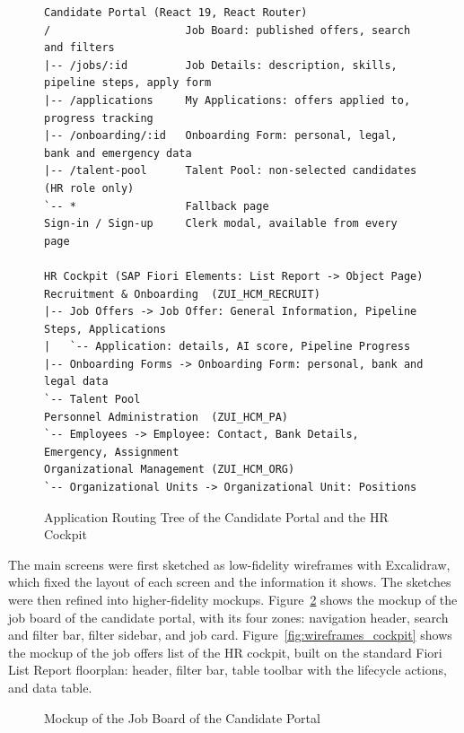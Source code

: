 \begin{figure}[H]
\centering
\begin{minipage}{0.97\textwidth}
\linespread{1}\selectfont\footnotesize
\begin{verbatim}
Candidate Portal (React 19, React Router)
/                     Job Board: published offers, search and filters
|-- /jobs/:id         Job Details: description, skills, pipeline steps, apply form
|-- /applications     My Applications: offers applied to, progress tracking
|-- /onboarding/:id   Onboarding Form: personal, legal, bank and emergency data
|-- /talent-pool      Talent Pool: non-selected candidates (HR role only)
`-- *                 Fallback page
Sign-in / Sign-up     Clerk modal, available from every page

HR Cockpit (SAP Fiori Elements: List Report -> Object Page)
Recruitment & Onboarding  (ZUI_HCM_RECRUIT)
|-- Job Offers -> Job Offer: General Information, Pipeline Steps, Applications
|   `-- Application: details, AI score, Pipeline Progress
|-- Onboarding Forms -> Onboarding Form: personal, bank and legal data
`-- Talent Pool
Personnel Administration  (ZUI_HCM_PA)
`-- Employees -> Employee: Contact, Bank Details, Emergency, Assignment
Organizational Management (ZUI_HCM_ORG)
`-- Organizational Units -> Organizational Unit: Positions
\end{verbatim}
\end{minipage}
\caption{Application Routing Tree of the Candidate Portal and the HR Cockpit}
\label{fig:routing_tree}
\end{figure}

The main screens were first sketched as low-fidelity wireframes with Excalidraw, which fixed the layout of each screen and the information it shows. The sketches were then refined into higher-fidelity mockups. Figure~\ref{fig:wireframes_portal} shows the mockup of the job board of the candidate portal, with its four zones: navigation header, search and filter bar, filter sidebar, and job card. Figure~\ref{fig:wireframes_cockpit} shows the mockup of the job offers list of the HR cockpit, built on the standard Fiori List Report floorplan: header, filter bar, table toolbar with the lifecycle actions, and data table.

\begin{figure}[H]
    \centering
    \caption{Mockup of the Job Board of the Candidate Portal}
    \label{fig:wireframes_portal}
\end{figure}

